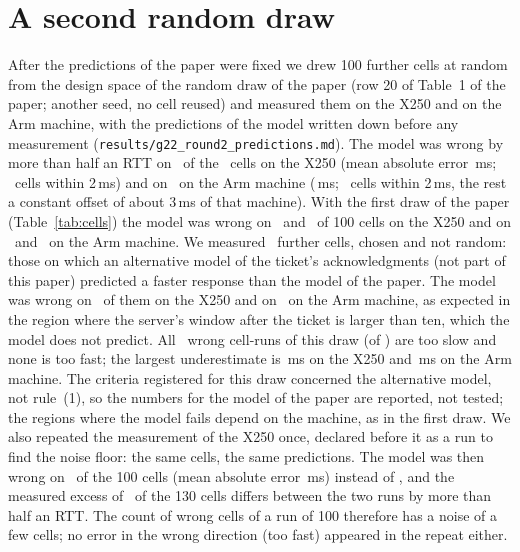 \documentclass[9pt]{article}
\begin{document}
\section*{A second random draw}
After the predictions of the paper were fixed we drew 100 further cells at random from the design space of the random draw of the paper (row 20 of Table~1 of the paper; another seed, no cell reused) and measured them on the X250 and on the Arm machine, with the predictions of the model written down before any measurement (\texttt{results/g22\_round2\_predictions.md}). The model was wrong by more than half an RTT on \GttXRWrong\ of the \GttXRN\ cells on the X250 (mean absolute error \GttXRMae\,ms; \GttXRTwo\ cells within 2\,ms) and on \GttARWrong\ on the Arm machine (\GttARMae\,ms; \GttARTwo\ cells within 2\,ms, the rest a constant offset of about 3\,ms of that machine). With the first draw of the paper (Table~\ref{tab:cells}) the model was wrong on \GnineCellsWrongXOne\ and \GttXRWrong\ of 100 cells on the X250 and on \GnineCellsWrongGx\ and \GttARWrong\ on the Arm machine. We measured \GttXFN\ further cells, chosen and not random: those on which an alternative model of the ticket's acknowledgments (not part of this paper) predicted a faster response than the model of the paper. The model was wrong on \GttXFWrong\ of them on the X250 and on \GttAFWrong\ on the Arm machine, as expected in the region where the server's window after the ticket is larger than ten, which the model does not predict. All \GttDirSlow\ wrong cell-runs of this draw (of \GttDirRuns) are too slow and none is too fast; the largest underestimate is \GttDirMaxX\,ms on the X250 and \GttDirMaxA\,ms on the Arm machine. The criteria registered for this draw concerned the alternative model, not rule~(1), so the numbers for the model of the paper are reported, not tested; the regions where the model fails depend on the machine, as in the first draw. We also repeated the measurement of the X250 once, declared before it as a run to find the noise floor: the same cells, the same predictions. The model was then wrong on \GttXRunTwoWrong\ of the 100 cells (mean absolute error \GttXRunTwoMae\,ms) instead of \GttXRWrong, and the measured excess of \GttXNoise\ of the 130 cells differs between the two runs by more than half an RTT. The count of wrong cells of a run of 100 therefore has a noise of a few cells; no error in the wrong direction (too fast) appeared in the repeat either.
\end{document}
